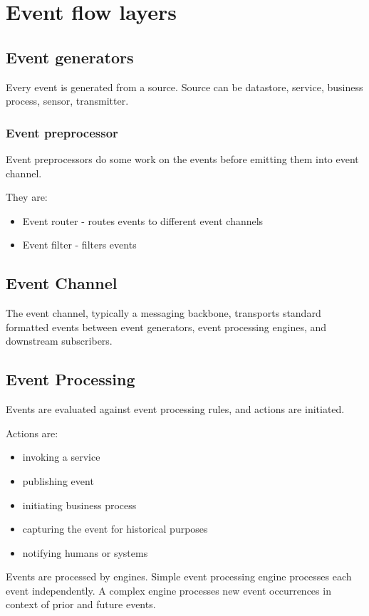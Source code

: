 \documentclass[12pt, a4paper]{article}
\begin{document}
\section{Event flow layers}

\subsection{Event generators}
Every event is generated from a source. Source can be datastore, service, business process, sensor, transmitter.

\subsubsection{Event preprocessor}
Event preprocessors do some work on the events before emitting them into event channel. 

They are:
\begin{itemize}
  \item Event router - routes events to different event channels
  \item Event filter - filters events
\end{itemize}

\subsection{Event Channel}
The event channel, typically a messaging backbone, transports standard formatted events between event generators, event processing engines, and downstream subscribers.

\subsection{Event Processing}
Events are evaluated against event processing rules, and actions are initiated. 

Actions are:
\begin{itemize}
  \item invoking a service
  \item publishing event
  \item initiating business process
  \item capturing the event for historical purposes
  \item notifying humans or systems
\end{itemize}

Events are processed by engines. Simple event processing engine processes each event independently. A complex engine processes new event occurrences in context of prior and future events.
\end{document}
